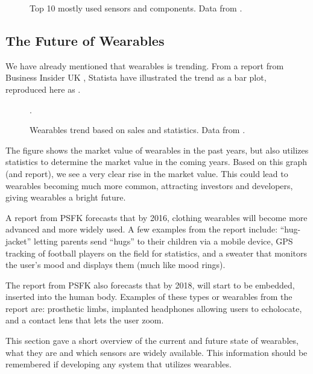 \begin{figure}[!htb]
    \centering
    
    \caption{Top 10 mostly used sensors and components. Data from \protect\cite{LISTOFWEARABLES}.}
    \label{fig:wearables-sensors}
\end{figure}

\subsection{The Future of Wearables}
We have already mentioned that wearables is trending. 
From a report from Business Insider UK \cite{WEARABLESTREND}, 
Statista \cite{WEARABLESTRENDNUMBERS}have illustrated the trend as a bar plot, 
reproduced here as .

\begin{figure}[!htb]
  \centering
  
  \caption{Wearables trend based on sales and statistics. Data from \protect\cite{WEARABLESTRENDNUMBERS}.}.
  \label{fig:wearables-trend}
\end{figure}

The figure shows the market value of wearables in the past years, 
but also utilizes statistics to determine the market value in the coming years. 
Based on this graph (and report), 
we see a very clear rise in the market value. 
This could lead to wearables becoming much more common,
attracting investors and developers, 
giving wearables a bright future. 

A report from PSFK \cite{PFSK} forecasts that by 2016, 
clothing wearables will become more advanced and more widely used. 
A few examples from the report include: 
``hug-jacket'' letting parents send ``hugs'' to their children via a mobile device, 
GPS tracking of football players on the field for statistics, 
and a sweater that monitors the user's mood and displays them (much like mood rings).

The report from PSFK also forecasts that by 2018, 
will start to be embedded, \ie inserted into the human body. 
Examples of these types or wearables from the report are: 
prosthetic limbs, implanted headphones allowing users to echolocate, 
and a contact lens that lets the user zoom.

This section gave a short overview of the current and future state of wearables, 
what they are and which sensors are widely available. 
This information should be remembered if developing any system that utilizes wearables. 

